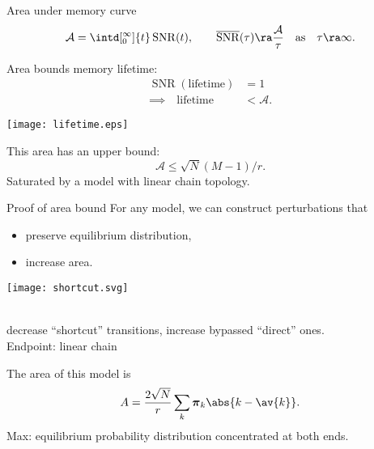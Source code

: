 \documentclass[final]{beamer}%
\DeclareMathOperator{\SNR}{SNR}
\DeclareMathOperator{\snr}{SNR}
\newcommand{\snrb}{\overline{\snr}}
\newcommand{\eq}{\boldsymbol{\pi}}
\newcommand{\area}{\mathcal{A}}
\begin{document}

\begin{frame}{Area under memory curve}
%
  \begin{equation*}
    \area = \intd[_0^\infty]{t} \snr(t),
    \qquad
    \snrb(\tau) \ra \frac{\area}{\tau}
    \quad \text{as} \quad \tau \ra \infty.
  \end{equation*}
%


  \vp\parbox{5cm}{
  Area bounds memory lifetime:\\
  \begin{equation*}
  \begin{aligned}
    \SNR(\text{lifetime})&=1
    \\
    \implies
    \quad
    \text{lifetime} &< \area.
  \end{aligned}
  \end{equation*}
  }
  \parbox{6.5cm}{
    \texttt{[image: lifetime.eps]}
  }

  \vp This area has an upper bound:
  \begin{equation*}
    \area \leq \sqrt{N}(M-1)/r.
  \end{equation*}
  Saturated by a model with linear chain topology.
%
\end{frame}


\begin{frame}[label=fr_areaproof]{Proof of area bound}
%
 For any model, we can construct perturbations that
 \parbox[c]{5cm}{
  \begin{itemize}
    \item preserve equilibrium distribution,
    \item increase area.
  \end{itemize}
  \hyperlink{fr_tech}{}
 }
 \parbox[c]{5cm}{
  \begin{center}
    \texttt{[image: shortcut.svg]}
  \end{center}
 }\\
 \eg decrease ``shortcut'' transitions, increase bypassed ``direct'' ones.\\
 Endpoint: linear chain

 \vp The area of this model is
 \begin{equation*}
   A = \frac{2\sqrt{N}}{r}\sum_k \eq_k \abs{k-\av{k}}.
 \end{equation*}
 \note[item]{max given $\eq$}
 \note[item]{now max \wrt $\eq$}
 Max: equilibrium probability distribution concentrated at both ends.
 \\
%
\end{frame}
\end{document}
